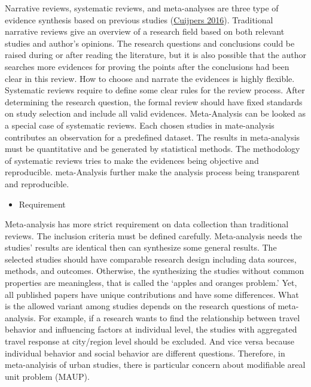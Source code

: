 \documentclass[
  11pt,
  openany]{memoir}
\providecommand{\tightlist}{%
  \setlength{\itemsep}{0pt}\setlength{\parskip}{0pt}}
\begin{document}
Narrative reviews, systematic reviews, and meta-analyses are three type of evidence synthesis based on previous studies (\protect\hyperlink{ref-cuijpersMetaanalysesMentalHealth2016}{Cuijpers 2016}).
Traditional narrative reviews give an overview of a research field based on both relevant studies and author's opinions.
The research questions and conclusions could be raised during or after reading the literature, but it is also possible that the author searches more evidences for proving the points after the conclusions had been clear in this review. How to choose and narrate the evidences is highly flexible.
Systematic reviews require to define some clear rules for the review process. After determining the research question, the formal review should have fixed standards on study selection and include all valid evidences.
Meta-Analysis can be looked as a special case of systematic reviews.
Each chosen studies in mate-analysis contributes an observation for a predefined dataset.
The results in meta-analysis must be quantitative and be generated by statistical methods.
The methodology of systematic reviews tries to make the evidences being objective and reproducible.
meta-Analysis further make the analysis process being transparent and reproducible.

\begin{itemize}
\tightlist
\item
  Requirement
\end{itemize}

Meta-analysis has more strict requirement on data collection than traditional reviews.
The inclusion criteria must be defined carefully.
Meta-analysis needs the studies' results are identical then can synthesize some general results.
The selected studies should have comparable research design including data sources, methods, and outcomes.
Otherwise, the synthesizing the studies without common properties are meaningless, that is called the `apples and oranges problem.'
Yet, all published papers have unique contributions and have some differences. What is the allowed variant among studies depends on the research questions of meta-analysis.
For example, if a research wants to find the relationship between travel behavior and influencing factors at individual level, the studies with aggregated travel response at city/region level should be excluded.
And vice versa because individual behavior and social behavior are different questions.
Therefore, in meta-analyisis of urban studies, there is particular concern about modifiable areal unit problem (MAUP).
\end{document}
